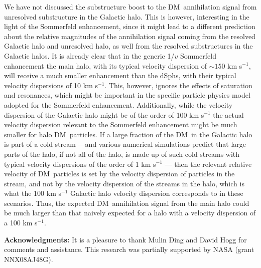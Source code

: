 \documentclass[aps,prd,twocolumn,amsmath,amssymb,floatfix,nofootinbib,10pt]{revtex4}
\newcommand{\DM}{DM}
\newcommand{\dSphs}{dSphs}
\begin{document}
We have not discussed the substructure boost to the \DM\ annihilation
signal from unresolved substructure in the Galactic halo. This is
however, interesting in the light of the Sommerfeld enhancement, since
it might lead to a different prediction about the relative magnitudes
of the annihilation signal coming from the resolved Galactic halo and
unresolved halo, as well from the resolved substructures in the
Galactic halos. It is already clear that in the generic 1/$v$
Sommerfeld enhancement the main halo, with its typical velocity
dispersion of $\sim\!150$ km s$^{-1}$, will receive a much smaller
enhancement than the \dSphs, with their typical velocity dispersions
of 10 km s$^{-1}$. This, however, ignores the effects of saturation
and resonances, which might be important in the specific particle
physics model adopted for the Sommerfeld enhancement. Additionally,
while the velocity dispersion of the Galactic halo might be of the
order of 100 km s$^{-1}$ the actual velocity dispersion relevant to
the Sommerfeld enhancement might be much smaller for halo \DM\
particles. If a large fraction of the \DM\ in the Galactic halo is
part of a cold stream ---and various numerical simulations predict
that large parts of the halo, if not all of the halo, is made up of
such cold streams with typical velocity dispersions of the order of 1
km s$^{-1}$ \cite{1999MNRAS.307..495H,2003MNRAS.339..834H}--- then the
relevant relative velocity of \DM\ particles is set by the velocity
dispersion of particles in the stream, and not by the velocity
dispersion of the streams in the halo, which is what the 100 km
s$^{-1}$ Galactic halo velocity dispersion corresponds to in these
scenarios. Thus, the expected \DM\ annihilation signal from the main
halo could be much larger than that naively expected for a halo with a
velocity dispersion of a 100 km s$^{-1}$.

{\bf Acknowledgments:} It is a pleasure to thank Mulin Ding and David
Hogg for comments and assistance. This research was partially
supported by NASA (grant NNX08AJ48G).





\end{document}
